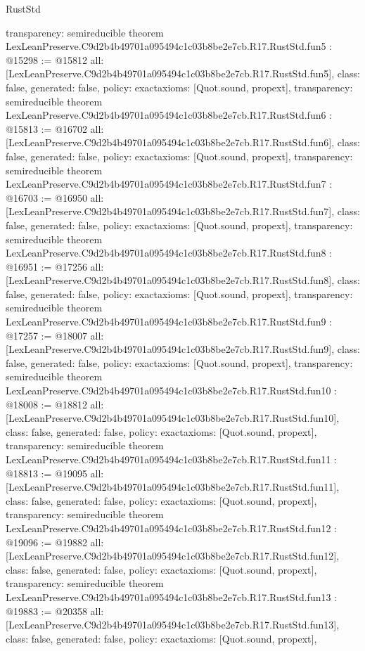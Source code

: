 \begin{lexlean}{RustStd}
\begin{coremodule}
{  transparency: semireducible
}
theorem LexLeanPreserve.C9d2b4b49701a095494c1c03b8be2e7cb.R17.RustStd.fun5 : @15298 := @15812 {
  all: [LexLeanPreserve.C9d2b4b49701a095494c1c03b8be2e7cb.R17.RustStd.fun5],
  class: false,
  generated: false,
  policy: exact{axioms: [Quot.sound, propext]},
  transparency: semireducible
}
theorem LexLeanPreserve.C9d2b4b49701a095494c1c03b8be2e7cb.R17.RustStd.fun6 : @15813 := @16702 {
  all: [LexLeanPreserve.C9d2b4b49701a095494c1c03b8be2e7cb.R17.RustStd.fun6],
  class: false,
  generated: false,
  policy: exact{axioms: [Quot.sound, propext]},
  transparency: semireducible
}
theorem LexLeanPreserve.C9d2b4b49701a095494c1c03b8be2e7cb.R17.RustStd.fun7 : @16703 := @16950 {
  all: [LexLeanPreserve.C9d2b4b49701a095494c1c03b8be2e7cb.R17.RustStd.fun7],
  class: false,
  generated: false,
  policy: exact{axioms: [Quot.sound, propext]},
  transparency: semireducible
}
theorem LexLeanPreserve.C9d2b4b49701a095494c1c03b8be2e7cb.R17.RustStd.fun8 : @16951 := @17256 {
  all: [LexLeanPreserve.C9d2b4b49701a095494c1c03b8be2e7cb.R17.RustStd.fun8],
  class: false,
  generated: false,
  policy: exact{axioms: [Quot.sound, propext]},
  transparency: semireducible
}
theorem LexLeanPreserve.C9d2b4b49701a095494c1c03b8be2e7cb.R17.RustStd.fun9 : @17257 := @18007 {
  all: [LexLeanPreserve.C9d2b4b49701a095494c1c03b8be2e7cb.R17.RustStd.fun9],
  class: false,
  generated: false,
  policy: exact{axioms: [Quot.sound, propext]},
  transparency: semireducible
}
theorem LexLeanPreserve.C9d2b4b49701a095494c1c03b8be2e7cb.R17.RustStd.fun10 : @18008 := @18812 {
  all: [LexLeanPreserve.C9d2b4b49701a095494c1c03b8be2e7cb.R17.RustStd.fun10],
  class: false,
  generated: false,
  policy: exact{axioms: [Quot.sound, propext]},
  transparency: semireducible
}
theorem LexLeanPreserve.C9d2b4b49701a095494c1c03b8be2e7cb.R17.RustStd.fun11 : @18813 := @19095 {
  all: [LexLeanPreserve.C9d2b4b49701a095494c1c03b8be2e7cb.R17.RustStd.fun11],
  class: false,
  generated: false,
  policy: exact{axioms: [Quot.sound, propext]},
  transparency: semireducible
}
theorem LexLeanPreserve.C9d2b4b49701a095494c1c03b8be2e7cb.R17.RustStd.fun12 : @19096 := @19882 {
  all: [LexLeanPreserve.C9d2b4b49701a095494c1c03b8be2e7cb.R17.RustStd.fun12],
  class: false,
  generated: false,
  policy: exact{axioms: [Quot.sound, propext]},
  transparency: semireducible
}
theorem LexLeanPreserve.C9d2b4b49701a095494c1c03b8be2e7cb.R17.RustStd.fun13 : @19883 := @20358 {
  all: [LexLeanPreserve.C9d2b4b49701a095494c1c03b8be2e7cb.R17.RustStd.fun13],
  class: false,
  generated: false,
  policy: exact{axioms: [Quot.sound, propext]},
}
\end{coremodule}
\end{lexlean}
